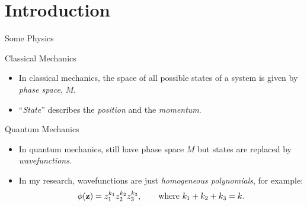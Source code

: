 \section{Introduction}

\begin{frame}{Some Physics}

    \begin{block}{Classical Mechanics}
        \begin{itemize}
            \item In classical mechanics, the space of all possible states of a system is given by \emph{phase space}, $M$.
            \item ``\emph{State}'' describes the \emph{position} and the \emph{momentum}.
        \end{itemize}
    \end{block}

    \begin{block}{Quantum Mechanics}
        \begin{itemize}
            \item In quantum mechanics, still have phase space $M$ but states are replaced by \emph{wavefunctions}.
            \item In my research, wavefunctions are just \emph{homogeneous polynomials}, for example:
            $$ \phi(\vb{z}) = z_{1}^{k_{1}}z_{2}^{k_{2}}z_{3}^{k_{3}}, \qquad \text{where } k_{1} + k_{2} + k_{3} = k. $$
        \end{itemize}
    \end{block}

\end{frame}